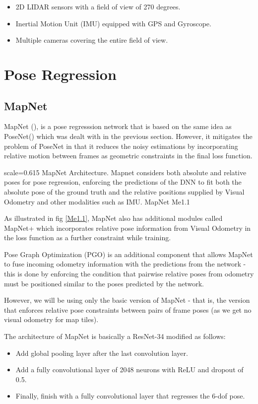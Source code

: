 \begin{itemize}
	\item 2D LIDAR sensors with a field of view of 270 degrees.
	\item Inertial Motion Unit (IMU) equipped with GPS and Gyroscope. 
	\item Multiple cameras covering the entire field of view.
\end{itemize}


\newpage
\section{Pose Regression}
\subsection{MapNet}
MapNet (\cite{Brahmbhatt2018}), is a pose regresssion network that is based on the same idea as PoseNet(\cite{Kendall2015}) which was dealt with in the previous section. However, it mitigates the problem of PoseNet in that it reduces the noisy estimations by incorporating relative motion between frames as geometric constraints in the final loss function. 

{scale=0.615}%
{MapNet Architecture. Mapnet considers both absolute and relative poses for pose regression, enforcing the predictions of the DNN to fit both the absolute pose of the ground truth and the relative positions supplied by Visual Odometry and other modalities such as IMU.}%
{MapNet}%
{Me1.1}

As illustrated in fig \ref{Me1.1}, MapNet also has additional modules called MapNet+ which incorporates relative pose information from Visual Odometry in the loss function as a further constraint while training. 

Pose Graph Optimization (PGO) is an additional component that allows MapNet to fuse incoming odometry information with the predictions from the network - this is done by enforcing the condition that pairwise relative poses from odometry must be positioned similar to the poses predicted by the network.

However, we will be using only the basic version of MapNet - that is, the version 
that enforces relative pose constraints between pairs of frame poses (as we get no visual odometry for map tiles).

The architecture of MapNet is basically a ResNet-34 modified as follows:
\begin{itemize}
	\item Add global pooling layer after the last convolution layer.
	\item Add a fully convolutional layer of 2048 neurons with ReLU and dropout of 0.5.
	\item Finally, finish with a fully convolutional layer that regresses the 6-dof pose. 
\end{itemize} 

